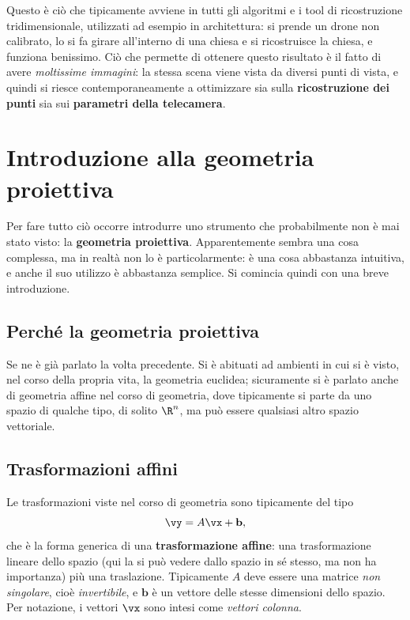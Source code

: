 Questo è ciò che tipicamente avviene in tutti gli algoritmi e i tool di ricostruzione tridimensionale, utilizzati ad esempio in architettura: si prende un drone non calibrato, lo si fa girare all'interno di una chiesa e si ricostruisce la chiesa, e funziona benissimo. Ciò che permette di ottenere questo risultato è il fatto di avere \emph{moltissime immagini}: la stessa scena viene vista da diversi punti di vista, e quindi si riesce contemporaneamente a ottimizzare sia sulla \textbf{ricostruzione dei punti} sia sui \textbf{parametri della telecamera}.

\section{Introduzione alla geometria proiettiva}

Per fare tutto ciò occorre introdurre uno strumento che probabilmente non è mai stato visto: la \textbf{geometria proiettiva}. Apparentemente sembra una cosa complessa, ma in realtà non lo è particolarmente: è una cosa abbastanza intuitiva, e anche il suo utilizzo è abbastanza semplice. Si comincia quindi con una breve introduzione.

\subsection{Perché la geometria proiettiva}

Se ne è già parlato la volta precedente. Si è abituati ad ambienti in cui si è visto, nel corso della propria vita, la geometria euclidea; sicuramente si è parlato anche di geometria affine nel corso di geometria, dove tipicamente si parte da uno spazio di qualche tipo, di solito $\R^n$, ma può essere qualsiasi altro spazio vettoriale.

\subsection{Trasformazioni affini}

Le trasformazioni viste nel corso di geometria sono tipicamente del tipo
\[
  \vy = A\vx + \mathbf{b},
\]
che è la forma generica di una \textbf{trasformazione affine}: una trasformazione lineare dello spazio (qui la si può vedere dallo spazio in sé stesso, ma non ha importanza) più una traslazione. Tipicamente $A$ deve essere una matrice \emph{non singolare}, cioè \emph{invertibile}, e $\mathbf{b}$ è un vettore delle stesse dimensioni dello spazio. Per notazione, i vettori $\vx$ sono intesi come \emph{vettori colonna}.

